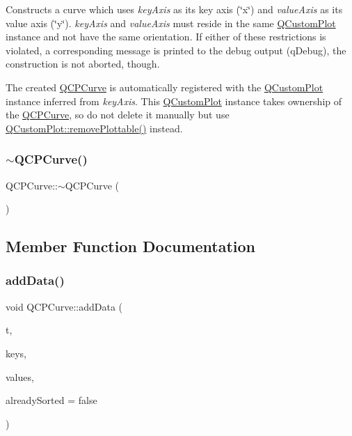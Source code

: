 Constructs a curve which uses {\itshape key\+Axis} as its key axis (\char`\"{}x\char`\"{}) and {\itshape value\+Axis} as its value axis (\char`\"{}y\char`\"{}). {\itshape key\+Axis} and {\itshape value\+Axis} must reside in the same \mbox{\hyperlink{class_q_custom_plot}{Q\+Custom\+Plot}} instance and not have the same orientation. If either of these restrictions is violated, a corresponding message is printed to the debug output (q\+Debug), the construction is not aborted, though.

The created \mbox{\hyperlink{class_q_c_p_curve}{Q\+C\+P\+Curve}} is automatically registered with the \mbox{\hyperlink{class_q_custom_plot}{Q\+Custom\+Plot}} instance inferred from {\itshape key\+Axis}. This \mbox{\hyperlink{class_q_custom_plot}{Q\+Custom\+Plot}} instance takes ownership of the \mbox{\hyperlink{class_q_c_p_curve}{Q\+C\+P\+Curve}}, so do not delete it manually but use \mbox{\hyperlink{class_q_custom_plot_af3dafd56884208474f311d6226513ab2}{Q\+Custom\+Plot\+::remove\+Plottable()}} instead. \mbox{\label{class_q_c_p_curve_a99ee5136754884a220cc0bcacfe419a3}} 
\subsubsection{\texorpdfstring{$\sim$QCPCurve()}{~QCPCurve()}}
{\footnotesize\ttfamily Q\+C\+P\+Curve\+::$\sim$\+Q\+C\+P\+Curve (\begin{DoxyParamCaption}{ }\end{DoxyParamCaption})\hspace{0.3cm}{\ttfamily [virtual]}}



\subsection{Member Function Documentation}
\mbox{\label{class_q_c_p_curve_a73edf394b94f3f24f07518e30565a07f}} 
\subsubsection{\texorpdfstring{addData()}{addData()}\hspace{0.1cm}{\footnotesize\ttfamily [1/4]}}
{\footnotesize\ttfamily void Q\+C\+P\+Curve\+::add\+Data (\begin{DoxyParamCaption}\item[{const Q\+Vector$<$ double $>$ \&}]{t,  }\item[{const Q\+Vector$<$ double $>$ \&}]{keys,  }\item[{const Q\+Vector$<$ double $>$ \&}]{values,  }\item[{bool}]{already\+Sorted = {\ttfamily false} }\end{DoxyParamCaption})}


